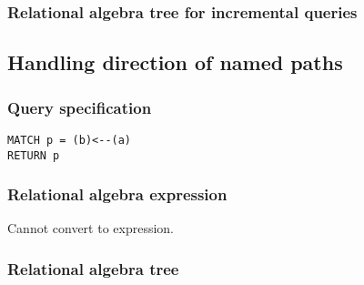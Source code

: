 
\subsubsection*{Relational algebra tree for incremental queries}


\subsection{Handling direction of named paths}

\subsubsection*{Query specification}

\begin{lstlisting}
MATCH p = (b)<--(a)
RETURN p
\end{lstlisting}

\subsubsection*{Relational algebra expression}

Cannot convert to expression.

\subsubsection*{Relational algebra tree}

